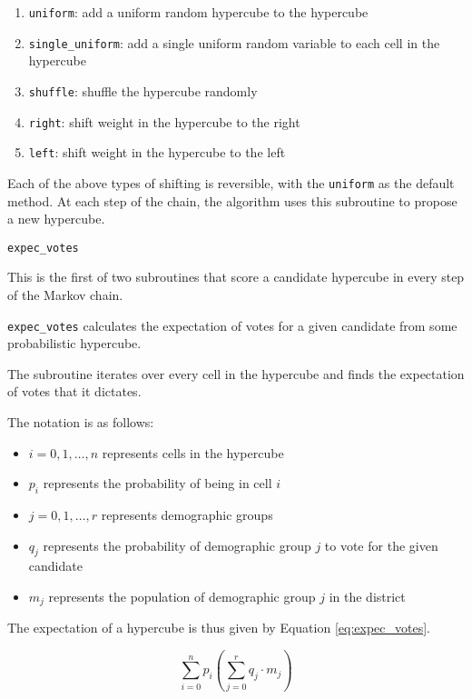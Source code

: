 \begin{enumerate}
  \item \texttt{uniform}: add a uniform random hypercube to the hypercube
  \item \texttt{single\_uniform}: add a single uniform random variable to each cell in the hypercube
  \item \texttt{shuffle}: shuffle the hypercube randomly
  \item \texttt{right}: shift weight in the hypercube to the right
  \item \texttt{left}: shift weight in the hypercube to the left
\end{enumerate}

Each of the above types of shifting is reversible, with the \texttt{uniform} as the default method. At each step of the chain, the algorithm uses this subroutine to propose a new hypercube.


\texttt{expec\_votes}


This is the first of two subroutines that score a candidate hypercube in every step of the Markov chain.

\texttt{expec\_votes} calculates the expectation of votes for a given candidate from some probabilistic hypercube.

The subroutine iterates over every cell in the hypercube and finds the expectation of votes that it dictates.

The notation is as follows:

\begin{itemize}
  \item $i = 0, 1, \dots, n$ represents cells in the hypercube
  \item $p_i$ represents the probability of being in cell $i$
  \item $j = 0, 1, \dots, r$ represents demographic groups
  \item $q_j$ represents the probability of demographic group $j$ to vote for the given candidate
  \item $m_j$ represents the population of demographic group $j$ in the district
\end{itemize}

The expectation of a hypercube is thus given by Equation \ref{eq:expec_votes}.

\begin{equation}
 \sum_{i = 0}^n p_i \left(\sum_{j = 0}^r q_j \cdot m_j\right)
 \label{eq:expec_votes}
\end{equation}

